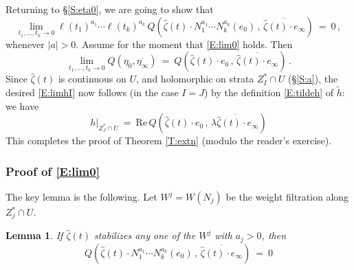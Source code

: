 \documentclass[12pt]{amsart}
\numberwithin{equation}{section}
\numberwithin{table}{section}
\def\z{\zeta}
\def\tRe{\mathrm{Re}} \def\tRic{\mathrm{Ric}}
\newtheorem{lemma}[equation]{Lemma}
\theoremstyle{definition}
\theoremstyle{definition}
\theoremstyle{remark}
\begin{document}
Returning to \S\ref{S:eta0}, we are going to show that 
\begin{equation}\label{E:lim0}
  \lim_{t_1,\ldots,t_k\to 0} \ell(t_1)^{a_1}\cdots\ell(t_k)^{a_k}\,
  Q \left( \hat\z(t) \cdot
  N_1^{a_1}\cdots N_k^{a_k}(e_0) \,,\,
  \overline{\hat\z(t) \cdot e_\infty}
  \right) \ = \ 0 \,,
\end{equation}
whenever $|a|>0$.  Assume for the moment that \eqref{E:lim0} holds.  Then
\begin{equation}\label{E:limQ}
  \lim_{t_1,\ldots,t_k\to 0} 
  Q \left( \eta_0 , \overline{\eta_\infty} \right)
  \ = \ Q \left( \hat\z(t) \cdot e_0 \,,\,
  \overline{\hat\z(t) \cdot e_\infty}
  \right) \,.
\end{equation}
Since $\hat\z(t)$ is continuous on $U$, and holomorphic on strata $Z_I^* \cap U$ (\S\ref{S:a}), the desired \eqref{E:limhI} now follows (in the case $I =J$) by the definition \eqref{E:tildeh} of $\tilde h$: we have 
\begin{equation}\label{E:hZJ}
  h|_{Z_J^* \cap U} \ = \ \tRe\, Q \left( \hat\z(t) \cdot e_0 \,,\,
  \overline{\lambda \hat\z(t) \cdot e_\infty}
  \right)
\end{equation}  
This completes the proof of Theorem \ref{T:extn} (modulo the reader's exercise).

\subsubsection{Proof of \eqref{E:lim0}} \label{S:lim0}

The key lemma is the following.  Let $W^j = W(N_j)$ be the weight filtration along $Z_j^* \cap U$.

\begin{lemma} \label{L:Q0}
If $\hat\z(t)$ stabilizes \emph{any} one of the $W^j$ with $a_j > 0$, then 
\begin{equation}\label{E:Q0}
  Q \left( \hat\z(t) \cdot
  N_1^{a_1}\cdots N_k^{a_k}(e_0) \,,\,
  \overline{\hat\z(t) \cdot e_\infty}
  \right) \ = \ 0
\end{equation}
\end{lemma}
\end{document}
